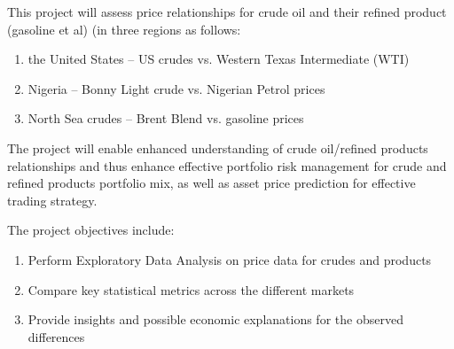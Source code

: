 \documentclass[12pt,twoside]{article}
\begin{document}
\begin{justify}
{\fontsize{11pt}{13.2pt}\selectfont This project will assess price relationships for crude oil and their refined product (gasoline et al) (in three regions as follows:\par}
\end{justify}\par

\begin{enumerate}
	\item the United States – US crudes vs. Western Texas Intermediate (WTI)\par

	\item Nigeria – Bonny Light crude vs. Nigerian Petrol prices\par

	\item North Sea crudes – Brent Blend vs. gasoline prices
\end{enumerate}\par

\begin{justify}
{\fontsize{11pt}{13.2pt}\selectfont The project will enable enhanced understanding of crude oil/refined products relationships and thus enhance effective portfolio risk management for crude and refined products portfolio mix, as well as asset price prediction for effective trading strategy.\par}
\end{justify}\par

\begin{justify}
{\fontsize{11pt}{13.2pt}\selectfont The project objectives include:\par}
\end{justify}\par

\begin{enumerate}[label*=\arabic*.]
	\item Perform Exploratory Data Analysis on price data for crudes and products\par

	\item Compare key statistical metrics across the different markets\par

	\item Provide insights and possible economic explanations for the observed differences
\end{enumerate}\par
\end{document}
